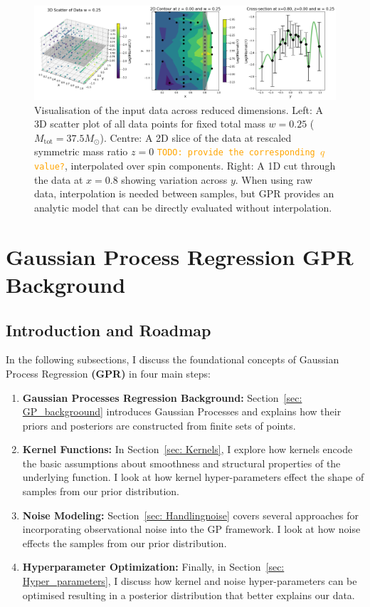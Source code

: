\documentclass[12pt]{article}
\newcommand{\todo}[1]{\textcolor{orange}{\texttt{TODO: #1}}}
\begin{document}
\begin{figure}[H]
    \centering
    \includegraphics[width=1\textwidth]{LatexPlots/final_gps_plots/data_visual.png}
    \caption{
    Visualisation of the input data across reduced dimensions. 
    Left: A 3D scatter plot of all data points for fixed total mass \(w = 0.25\) ($M_\text{tot}=37.5 M_\odot$). 
    Centre: A 2D slice of the data at rescaled symmetric mass ratio \(z = 0\) \todo{provide the corresponding $q$ value?}, interpolated over spin components.
    Right: A 1D cut through the data at \(x = 0.8\) showing variation across \(y\). 
    When using raw data, interpolation is needed between samples, but GPR provides an analytic model that can be directly evaluated without interpolation.
    }
    \label{fig:visualising_data}
\end{figure}








\section{Gaussian Process Regression \textbf{GPR} Background}
\subsection{Introduction and Roadmap}

In the following subsections, I discuss the foundational concepts of Gaussian Process Regression \textbf{(GPR)} in four main steps:
\begin{enumerate}
    \item \textbf{Gaussian Processes Regression Background:} Section~\ref{sec: GP_backgroound} introduces Gaussian Processes and explains how their priors and posteriors are constructed from finite sets of points.
    \item \textbf{Kernel Functions:} In Section~\ref{sec: Kernels}, I explore how kernels encode the basic assumptions about smoothness and structural properties of the underlying function. I look at how kernel hyper-parameters effect the shape of samples from our prior distribution.
    \item \textbf{Noise Modeling:} Section~\ref{sec: Handlingnoise} covers several approaches for incorporating observational noise into the GP framework. I look at how noise effects the samples from our prior distribution.
    \item \textbf{Hyperparameter Optimization:} Finally, in Section~\ref{sec: Hyper_parameters}, I discuss how kernel and noise hyper-parameters can be optimised resulting in a posterior distribution that better explains our data.
\end{enumerate}
\end{document}
